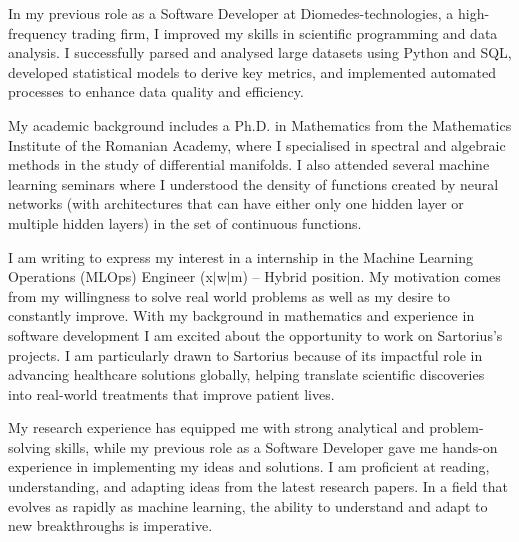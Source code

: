 \documentclass[11pt, a4paper]{awesome-cv}
\begin{document}
\makecvheader[R]

\makecvfooter
  {}
  {}
  {}

\makelettertitle

\begin{cvletter}

In my previous role as a Software Developer at Diomedes-technologies, a high-frequency trading firm, I improved my skills in scientific programming and data analysis. I successfully parsed and analysed large datasets using Python and SQL, developed statistical models to derive key metrics, and implemented automated processes to enhance data quality and efficiency. 

My academic background includes a Ph.D. in Mathematics from the Mathematics Institute of the Romanian Academy, where I specialised in spectral and algebraic methods in the study of differential manifolds. I also attended several machine learning seminars where I understood the density of functions created by neural networks (with architectures that can have either only one hidden layer or multiple hidden layers) in the set of continuous functions.


I am writing to express my interest in a internship in the Machine Learning Operations (MLOps) Engineer (x$|$w$|$m) – Hybrid position. My motivation comes from my willingness to solve real world problems as well as my desire to constantly improve. With my background in mathematics and experience in software development I am excited about the opportunity to work on Sartorius's projects. I am particularly drawn to Sartorius because of its impactful role in advancing healthcare solutions globally, helping translate scientific discoveries into real-world treatments that improve patient lives.

My research experience has equipped me with strong analytical and problem-solving skills, while my previous role as a Software Developer gave me hands-on experience in implementing my ideas and solutions. I am proficient at reading, understanding, and adapting ideas from the latest research papers. In a field that evolves as rapidly as machine learning, the ability to understand and adapt to new breakthroughs is imperative.

\end{cvletter}


\makeletterclosing
\end{document}
